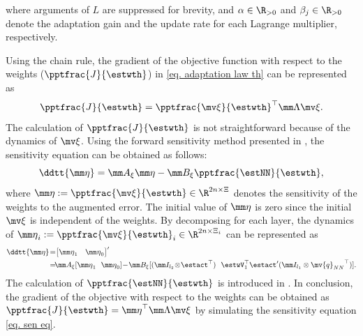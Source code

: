 \documentclass[letterpaper, 10 pt, conference]{ieeeconf}  %
\newcommand*{\q}{\mv{q}}
\begin{document}
where arguments of $L$ are suppressed for brevity, and $\alpha\in\R_{>0}$ and $\beta_j\in\R_{>0}$ denote the adaptation gain and the update rate for each Lagrange multiplier, respectively.
\color{red}
\color{black}

Using the chain rule, the gradient of the objective function with respect to the weights (\ie $\pptfrac{J}{\estwth}$) in \eqref{eq. adaptation law th} can be represented as
\begin{equation}
    \pptfrac{J}{\estwth}
    =
    \pptfrac{\mv\xi}{\estwth}^\top 
    \mm \Lambda
    \mv\xi
    .
\end{equation}
The calculation of $\pptfrac{J}{\estwth}$ is not straightforward because of the dynamics of $\mv\xi$.
Using the forward sensitivity method presented in \cite{Sengupta:2014aa}, the sensitivity equation can be obtained as follows:
\begin{equation}
    \ddtt{\mm \eta} =
    \mm A_\xi \mm\eta
    - \mm B_\xi 
    \pptfrac{\estNN}{\estwth}
    ,
    \label{eq. sen eq}
\end{equation}
where ${\mm \eta}:= \pptfrac{\mv\xi}{\estwth}\in\R^{2n\times \Xi}$ denotes the sensitivity of the weights to the augmented error.
The initial value of ${\mm \eta}$ is zero since the initial $\mv\xi$ is independent of the weights.
By decomposing for each layer, the dynamics of ${\mm \eta}_i:= \pptfrac{\mv\xi}{\estwth}_i\in\R^{2n\times \Xi_i}$ can be represented as
\begin{equation}
    \begin{aligned}
        \ddtt{\mm \eta} 
        \!=\!&
        \begin{bmatrix}
            {\mm \eta}_1&{\mm \eta}_0
        \end{bmatrix}'
        \\
        \!=\!&
        \mm A_\xi
        [
            {\mm \eta}_1
            \ \ 
            {\mm \eta}_0
        ]
        \!-\!
        \mm B_\xi
        [
            (\mm I_{l_2}\!\otimes\!\estact^\top )
            \ \ 
            \estwV_1^\top \estact'(\mm I_{l_1}\otimes {\q_{NN}}^\top )
        ]
        .
    \end{aligned}
\end{equation}
The calculation of $\pptfrac{\estNN}{\estwth}$ is introduced in \cite{Patil:2022aa}.
In conclusion, the gradient of the objective with respect to the weights can be obtained as $\pptfrac{J}{\estwth} = {\mm \eta}^\top\mm \Lambda\mv\xi$ by simulating the sensitivity equation \eqref{eq. sen eq}.
\end{document}
